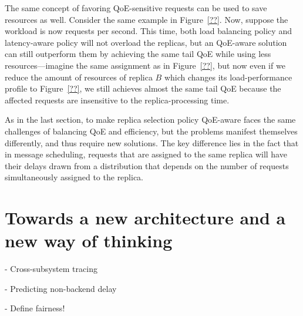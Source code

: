The same concept of favoring QoE-sensitive requests can be used to save resources as well.
Consider the same example in Figure~\ref{??}. 
Now, suppose the workload is now \fillme requests per second. 
This time, both load balancing policy and latency-aware policy will not overload the replicas, but an QoE-aware solution can still outperform them by achieving the same tail QoE while using less resources---imagine the same assignment as in Figure~\ref{??}, but now even if we reduce the amount of resources of replica $B$ which changes its load-performance profile to Figure~\ref{??}, we still achieves almost the same tail QoE because the affected requests are insensitive to the replica-processing time.

As in the last section, to make replica selection policy QoE-aware faces the same challenges of balancing QoE and efficiency, but the problems manifest themselves differently, and thus require new solutions.
The key difference lies in the fact that in message scheduling, 
requests that are assigned to the same replica will have their delays drawn from a distribution that depends on the number of requests simultaneously assigned to the replica.





\section{Towards a new architecture and a new way of thinking}
\label{sec:arch}




- Cross-subsystem tracing

- Predicting non-backend delay

- Define fairness!







